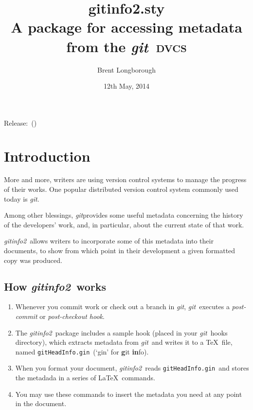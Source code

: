 \documentclass[draft,a4paper,12pt,twoside,openany]{memoir}
\newcommand{\sfit}[1]{\textit{#1}}
\newcommand{\git}{\sfit{git}}
\newcommand{\tpname}{\sfit{gitinfo2}}
\newcommand{\tpfname}{\textsf{gitinfo2.sty}}
\newcommand{\ginname}{gitHeadInfo.gin}
\newcommand{\metaname}{\texttt{\ginname}}
\begin{document}
\frontmatter
\title{%
	\Huge \tpfname\\[2ex]%
	\Large A package for accessing metadata\\from the \git\ \textsc{dvcs}
	}
\author{Brent Longborough}
\date{12th May, 2014}
\maketitle

{\centering
Release:\gitReln\ (\gitAbbrevHash)\\
}
\begingroup
\thispagestyle{empty}
\setlength{\afterchapskip}{20pt}
\let\clearpage\relax
\let\chaptitlefont\Large\bfseries
\vspace*{5\baselineskip}
\tableofcontents*
\endgroup
\mainmatter
\pagestyle{giruled}
\chapter{Introduction}
More and more, writers are using version control systems
to manage the progress of their works.
One popular distributed version control system commonly used today
is \git.

Among other blessings, \git provides
some useful metadata concerning the history of the developers'
work, and, in particular, about the current state of that work.

\tpname\ allows writers to incorporate some of this metadata
into their documents, to show from which point in their development
a given formatted copy was produced.

\section{How \tpname\ works}
\begin{enumerate}
\item Whenever you commit work or check out a branch in \git,
\git\ executes a \textit{post-commit} or \textit{post-checkout hook}.

\item The \tpname\ package includes a sample hook
(placed in your \git\ hooks directory),
which extracts metadata from \git\ and writes it to a \TeX\ file,
named \metaname\ (`gin' for \textbf{g}it \textbf{in}fo).

\item When you format your document, \tpname\ reads
\metaname\ and stores the metadada
in a series of \LaTeX\ commands.

\item You may use these commands to insert
the metadata you need at any point in the document.
\end{enumerate}
\end{document}
